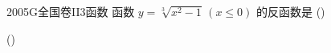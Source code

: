
\begin{problem}{2005}{G}{全国卷II}{3}{函数}
函数 $ y=\sqrt[3]{x^2-1}\, (x\leqslant 0) $ 的反函数是 (\hspace{1cm})

(\hspace{1cm})
\begin{choices}
\end{choices}
\end{problem}

\begin{answer}

\end{answer}

\begin{solutions}

\end{solutions}